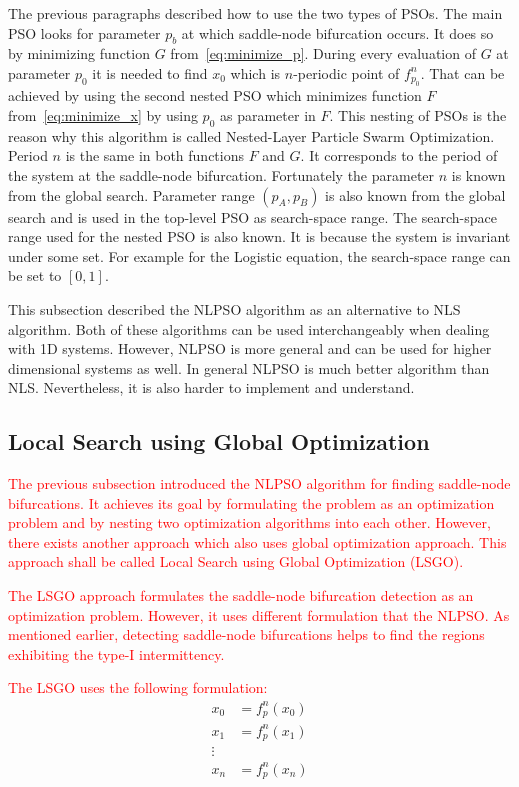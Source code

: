\par
The previous paragraphs described how to use the two types of PSOs.
The main PSO looks for parameter $p_b$ at which saddle-node bifurcation occurs.
It does so by minimizing function $G$ from~\ref{eq:minimize_p}.
During every evaluation of $G$ at parameter $p_0$ it is needed to find $x_0$ which is $n$-periodic point of $f^{n}_{p_0}$.
That can be achieved by using the second nested PSO which minimizes function $F$ from~\ref{eq:minimize_x} by using $p_0$ as parameter in $F$.
This nesting of PSOs is the reason why this algorithm is called Nested-Layer Particle Swarm Optimization.
Period $n$ is the same in both functions $F$ and $G$.
It corresponds to the period of the system at the saddle-node bifurcation.
Fortunately the parameter $n$ is known from the global search.
Parameter range $(p_A, p_B)$ is also known from the global search and is used in the top-level PSO as search-space range.
The search-space range used for the nested PSO is also known.
It is because the system is invariant under some set.
For example for the Logistic equation, the search-space range can be set to $[0, 1]$.
\par
This subsection described the NLPSO algorithm as an alternative to NLS algorithm.
Both of these algorithms can be used interchangeably when dealing with 1D systems.
However, NLPSO is more general and can be used for higher dimensional systems as well.
In general NLPSO is much better algorithm than NLS.
Nevertheless, it is also harder to implement and understand.

\subsection{Local Search using Global Optimization}
\textcolor{red}{
The previous subsection introduced the NLPSO algorithm for finding saddle-node bifurcations.
It achieves its goal by formulating the problem as an optimization problem and by nesting two optimization algorithms into each other.
However, there exists another approach which also uses global optimization approach.
This approach shall be called Local Search using Global Optimization (LSGO).
}
\par
\textcolor{red}{
The LSGO approach formulates the saddle-node bifurcation detection as an optimization problem.
However, it uses different formulation that the NLPSO.
As mentioned earlier, detecting saddle-node bifurcations helps to find the regions exhibiting the type-I intermittency.
}
\par
\textcolor{red}{
The LSGO uses the following formulation:
}
\begin{align*} 
x_0 &= f_{p}^{n}(x_0)\\
x_1 &= f_{p}^{n}(x_1)\\
\vdots \\
x_n &= f_{p}^{n}(x_n)\\
\end{align*}

